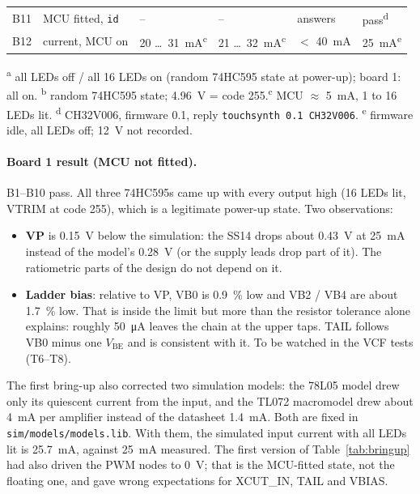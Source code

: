 \documentclass[11pt,a4paper]{article}
\newcommand{\file}[1]{\texttt{#1}}
\begin{document}
\begin{table}[h]
\begin{tabularx}{\textwidth}{@{}l >{\raggedright\arraybackslash}X l l l l@{}}
B11 & MCU fitted, \texttt{id} & -- & -- & answers & pass\textsuperscript{d} \\
B12 & current, MCU on & 20 \ldots\ \SI{31}{mA}\textsuperscript{c} & 21 \ldots\ \SI{32}{mA}\textsuperscript{c} & $<$ \SI{40}{mA} & \SI{25}{mA}\textsuperscript{e} \\
\bottomrule
\end{tabularx}\par\smallskip
\raggedright\textsuperscript{a} all LEDs off / all 16 LEDs on (random 74HC595 state at power-up); board 1: all on.\quad
\textsuperscript{b} random 74HC595 state; \SI{4.96}{V} = code 255.\quad \textsuperscript{c} MCU $\approx$ \SI{5}{mA}, 1 to 16 LEDs lit.\quad
\textsuperscript{d} CH32V006, firmware 0.1, reply \texttt{touchsynth 0.1 CH32V006}.\quad
\textsuperscript{e} firmware idle, all LEDs off; \SI{12}{V} not recorded.
\end{table}

\paragraph{Board 1 result (MCU not fitted).} B1--B10 pass. All three 74HC595s came up with every output high
(16 LEDs lit, VTRIM at code 255), which is a legitimate power-up state. Two observations:
\begin{itemize}
  \item \textbf{VP} is \SI{0.15}{V} below the simulation: the SS14 drops about \SI{0.43}{V} at \SI{25}{mA}
    instead of the model's \SI{0.28}{V} (or the supply leads drop part of it). The ratiometric parts of the
    design do not depend on it.
  \item \textbf{Ladder bias}: relative to VP, VB0 is \SI{0.9}{\percent} low and VB2 / VB4 are about
    \SI{1.7}{\percent} low. That is inside the limit but more than the resistor tolerance alone explains:
    roughly \SI{50}{\micro A} leaves the chain at the upper taps. TAIL follows VB0 minus one $V_\mathrm{BE}$
    and is consistent with it. To be watched in the VCF tests (T6--T8).
\end{itemize}
The first bring-up also corrected two simulation models: the 78L05 model drew only its quiescent current
from the input, and the TL072 macromodel drew about \SI{4}{mA} per amplifier instead of the datasheet
\SI{1.4}{mA}. Both are fixed in \file{sim/models/models.lib}. With them, the simulated input current with all
LEDs lit is \SI{25.7}{mA}, against \SI{25}{mA} measured. The first version of Table~\ref{tab:bringup} had also
driven the PWM nodes to \SI{0}{V}; that is the MCU-fitted state, not the floating one, and gave wrong
expectations for XCUT\_IN, TAIL and VBIAS.
\end{document}
